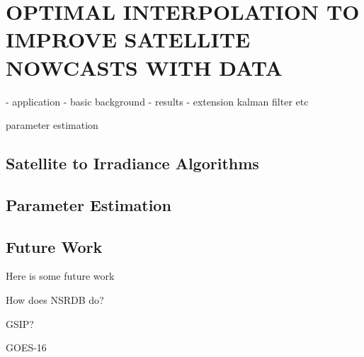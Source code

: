 \chapter{OPTIMAL INTERPOLATION TO IMPROVE SATELLITE NOWCASTS WITH DATA}
\label{chap:satoi}

- application
- basic background
- results
- extension kalman filter etc

parameter estimation

\section{Satellite to Irradiance Algorithms}

\section{Parameter Estimation}

\section{Future Work}

Here is some future work

How does NSRDB do?

GSIP?

GOES-16

